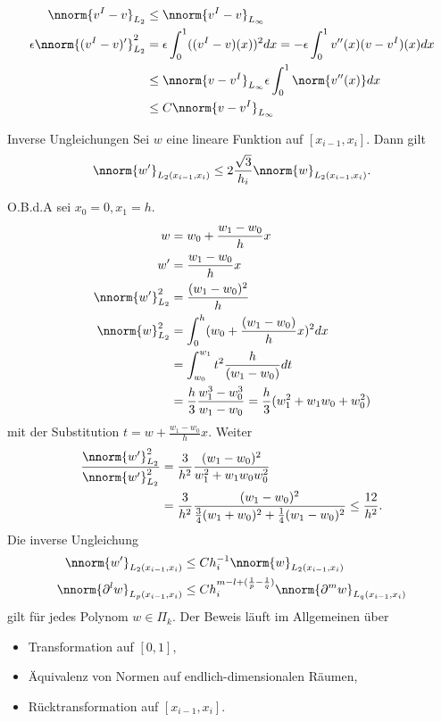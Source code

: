 \begin{beweis}
  \begin{align*}
    \nnorm{v^I - v}_{L_{2}} &\leq \nnorm{v^I - v}_{L_{\infty}}\\
    \epsilon\nnorm{(v^I - v)'}_{L_{2}} ^{2} &= \epsilon \int_{0}^{1} ((v^{I} - v) (x))^{2} dx = - \epsilon \int_{0}^{1} v''(x)(v - v^{I}) (x) dx\\
    &\leq \nnorm{v - v^{I}}_{L_{\infty}} \epsilon \int_{0}^{1} \norm{v''(x)} dx\\
    &\leq C\nnorm{v - v^{I}}_{L_{\infty}} 
  \end{align*}
\end{beweis}
\begin{lemma*} Inverse Ungleichungen
  Sei  $w$ eine lineare Funktion auf $[x_{i-1}, x_{i}]$. Dann gilt
  \begin{align*}
    \nnorm{w'}_{L_{2}(x_{i-1}, x_{i})} \leq 2 \frac{\sqrt 3}{h_{i}} \nnorm{w}_{L_{2}(x_{i-1}, x_{i})}. 
  \end{align*}
\end{lemma*}
\begin{beweis}O.B.d.A sei $x_{0} = 0, x_{1} = h$. 
  \begin{align*} 
    w &= w_{0} + \frac{w_{1} - w_{0}} h x\\
    w' &=\frac{w_{1} - w_{0}} h x\\
    \nnorm{w'}_{L_{2}}^{2} &=\frac{(w_{1} - w_{0})^{2}} h \\
    \nnorm{w}_{L_{2}}^{2} &= \int_{0}^{h} (w_{0} + \frac{(w_{1} - w_{0})} hx)^{2} dx \\
    &= \int_{w_{0}}^{w_{1}} t^{2} \frac{ h }{(w_{1} - w_{0})} dt \\
    &= \frac h 3 \frac{w_{1}^{3} - w_{0}^{3}}{w_{1} - w_{0}} = \frac h 3 (w_{1}^{2} + w_{1}w_{0} + w_{0}^{2})
  \end{align*}
  mit der Substitution $t = w + \frac {w_{1} - w_{0}} h x$. Weiter
  \begin{align*}
    \frac {\nnorm {w'}_{L_{2}}^{2}}{\nnorm {w'}_{L_{2}}^{2}} &= \frac 3 {h^{2}} \frac{(w_{1} - w_{0})^{2}} {w_{1}^{2} + w_{1}w_{0} w_{0}^{2}} \\
    &= \frac 3 {h^{2}} \frac {(w_{1} - w_{0})^{2}}{\frac 34 (w_{1} + w_{0})^{2} + \frac 14 (w_{1} - w_{0})^{2}} \leq \frac {12}{h^{2}}. 
  \end{align*}
  Die inverse Ungleichung
  \begin{align*}
    \nnorm{w'}_{L_{2}(x_{i-1}, x_{i})} &\leq  C h_{i}^{-1} \nnorm{w}_{L_{2}(x_{i-1}, x_{i})}\\
    \nnorm{\partial^{l} w}_{L_{p}(x_{i-1}, x_{i})} &\leq  C h_{i}^{m - l + (\frac 1 p - \frac 1 q)} \nnorm{\partial^{m} w}_{L_{q}(x_{i-1}, x_{i})}\\
  \end{align*}
  gilt für jedes Polynom $w \in \Pi_{k}$. Der Beweis läuft im Allgemeinen über
  \begin{itemize}
  \item Transformation auf $[0, 1]$, 
  \item Äquivalenz von Normen auf endlich-dimensionalen Räumen, 
  \item Rücktransformation auf $[x_{i-1}, x_{i}]$. 
  \end{itemize}
\end{beweis}
